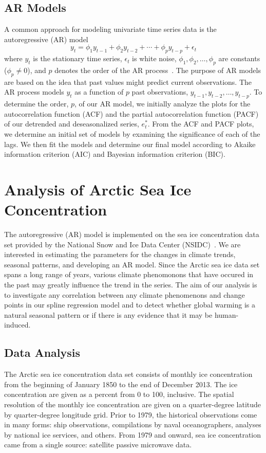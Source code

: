 \documentclass[12pt]{article}
\begin{document}
\subsection{AR Models}
A common approach for modeling univariate time series data is the autoregressive (AR) model
$$y_t = \phi_{1}y_{t-1} + \phi_{2}y_{t-2} + \cdots + \phi_{p}y_{t-p} + \epsilon_t$$
where $y_t$ is the stationary time series, $\epsilon_t$ is white noise, $\phi_1, \phi_2, \dots, \phi_p$ are constants ($\phi_p \neq 0$), and $p$ denotes the order of the AR process~\citep{shumway}. The purpose of AR models are based on the idea that past values might predict current observations. The AR process models $y_t$ as a function of $p$ past observations, $y_{t-1}, y_{t-2}, \dots, y_{t-p}$. To determine the order, $p$, of our AR model, we initially analyze the plots for the autocorrelation function (ACF) and the partial autocorrelation function (PACF) of our detrended and deseasonalized series, $e^{*}_{t}$. From the ACF and PACF plots, we determine an initial set of models by examining the significance of each of the lags. We then fit the models and determine our final model according to Akaike information criterion (AIC) and Bayesian information criterion (BIC).


\section{Analysis of Arctic Sea Ice Concentration}
The autoregressive (AR) model is implemented on the sea ice concentration data set provided by the National Snow and Ice Data Center (NSIDC)~\citep{data}. We are interested in estimating the parameters for the changes in climate trends, seasonal patterns, and developing an AR model. Since the Arctic sea ice data set spans a long range of years, various climate phenomonons that have occured in the past may greatly influence the trend in the series. The aim of our analysis is to investigate any correlation between any climate phenomenons and change points in our spline regression model and to detect whether global warming is a natural seasonal pattern or if there is any evidence that it may be human-induced.

\subsection{Data Analysis}
The Arctic sea ice concentration data set consists of monthly ice concentration from the beginning of January 1850 to the end of December 2013. The ice concentration are given as a percent from 0 to 100, inclusive. The spatial resolution of the monthly ice concentration are given on a quarter-degree latitude by quarter-degree longitude grid. Prior to 1979, the historical observations come in many forms: ship observations, compilations by naval oceanographers, analyses by national ice services, and others. From 1979 and onward, sea ice concentration came from a single source: satellite passive microwave data.
\end{document}

